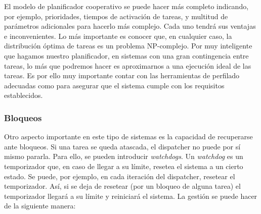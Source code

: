\documentclass[../main.tex]{subfiles}
\begin{document}
\begin{center}
        
        \end{center}

        El modelo de planificador cooperativo se puede hacer más completo indicando, por ejemplo, prioridades, tiempos de activación de tareas, y multitud de parámetros adicionales para hacerlo más complejo. Cada uno tendrá sus ventajas e inconvenientes. Lo más importante es conocer que, en cualquier caso, la distribución óptima de tareas es un problema NP-complejo. Por muy inteligente que hagamos nuestro planificador, en sistemas con una gran contingencia entre tareas, lo más que podremos hacer es aproximarnos a una ejecución ideal de las tareas. Es por ello muy importante contar con las herramientas de perfilado adecuadas como para asegurar que el sistema cumple con los requisitos establecidos.

        \subsubsection{Bloqueos}

            Otro aspecto importante en este tipo de sistemas es la capacidad de recuperarse ante bloqueos. Si una tarea se queda atascada, el dispatcher no puede por sí mismo pararla. Para ello, se pueden introducir \emph{watchdogs}. Un \emph{watchdog} es un temporizador que, en caso de llegar a su límite, resetea el sistema a un cierto estado. Se puede, por ejemplo, en cada iteración del dispatcher, resetear el temporizador. Así, si se deja de resetear (por un bloqueo de alguna tarea) el temporizador llegará a su límite y reiniciará el sistema. La gestión se puede hacer de la siguiente manera:
\end{document}
